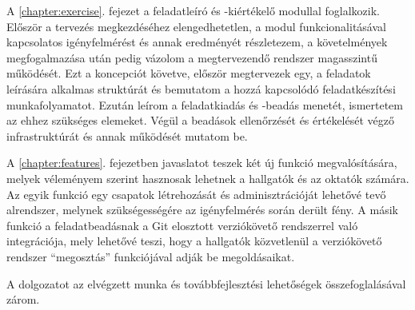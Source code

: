 A \ref{chapter:exercise}. fejezet a feladatleíró és -kiértékelő modullal foglalkozik.
Először a tervezés megkezdéséhez elengedhetetlen, a modul funkcionalitásával kapcsolatos igényfelmérést és annak eredményét részletezem, a követelmények megfogalmazása után pedig vázolom a megtervezendő rendszer magasszintű működését.
Ezt a koncepciót követve, először megtervezek egy, a feladatok leírására alkalmas struktúrát és bemutatom a hozzá kapcsolódó feladatkészítési munkafolyamatot.
Ezután leírom a feladatkiadás és -beadás menetét, ismertetem az ehhez szükséges elemeket.
Végül a beadások ellenőrzését és értékelését végző infrastruktúrát és annak működését mutatom be.

A \ref{chapter:features}. fejezetben javaslatot teszek két új funkció megvalósítására, melyek véleményem szerint hasznosak lehetnek a hallgatók és az oktatók számára.
Az egyik funkció egy csapatok létrehozását és adminisztrációját lehetővé tevő alrendszer, melynek szükségességére az igényfelmérés során derült fény.
A másik funkció a feladatbeadásnak a Git elosztott verziókövető rendszerrel való integrációja, mely lehetővé teszi, hogy a hallgatók közvetlenül a verziókövető rendszer ``megosztás'' funkciójával adják be megoldásaikat.

A dolgozatot az elvégzett munka és továbbfejlesztési lehetőségek összefoglalásával zárom.
